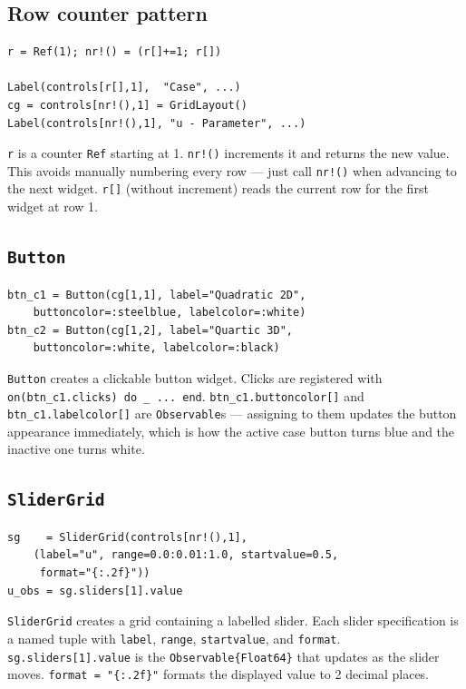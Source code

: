 \documentclass[12pt, a4paper]{article}
\newcommand{\cd}[1]{\texttt{#1}}
\begin{document}
\subsection{Row counter pattern}

\begin{verbatim}
r = Ref(1); nr!() = (r[]+=1; r[])

Label(controls[r[],1],  "Case", ...)
cg = controls[nr!(),1] = GridLayout()
Label(controls[nr!(),1], "u - Parameter", ...)
\end{verbatim}

\cd{r} is a counter \cd{Ref} starting at 1.
\cd{nr!()} increments it and returns the new value.
This avoids manually numbering every row --- just call
\cd{nr!()} when advancing to the next widget.
\cd{r[]} (without increment) reads the current row
for the first widget at row 1.

\subsection{\texttt{Button}}

\begin{verbatim}
btn_c1 = Button(cg[1,1], label="Quadratic 2D",
    buttoncolor=:steelblue, labelcolor=:white)
btn_c2 = Button(cg[1,2], label="Quartic 3D",
    buttoncolor=:white, labelcolor=:black)
\end{verbatim}

\cd{Button} creates a clickable button widget.
Clicks are registered with \cd{on(btn\_c1.clicks) do \_ ... end}.
\cd{btn\_c1.buttoncolor[]} and \cd{btn\_c1.labelcolor[]}
are \cd{Observable}s --- assigning to them updates the
button appearance immediately, which is how the active
case button turns blue and the inactive one turns white.

\subsection{\texttt{SliderGrid}}

\begin{verbatim}
sg    = SliderGrid(controls[nr!(),1],
    (label="u", range=0.0:0.01:1.0, startvalue=0.5,
     format="{:.2f}"))
u_obs = sg.sliders[1].value
\end{verbatim}

\cd{SliderGrid} creates a grid containing a labelled
slider.
Each slider specification is a named tuple with
\cd{label}, \cd{range}, \cd{startvalue}, and \cd{format}.
\cd{sg.sliders[1].value} is the \cd{Observable\{Float64\}}
that updates as the slider moves.
\cd{format = "\{:.2f\}"} formats the displayed value to
2 decimal places.
\end{document}
